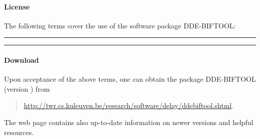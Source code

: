 \documentclass[10pt]{scrartcl}
\newcommand{\DDEBIFCODE}{\textsc{DDE-BIFTOOL}}
\newcommand{\ddebifweb}{\url{http://twr.cs.kuleuven.be/research/software/delay/ddebiftool.shtml}}
\begin{document}
\paragraph{License}
The following terms cover the use of the software package {\DDEBIFCODE}:

\bigskip\hrule
{\ttfamily
\begin{flushleft} {\parindent0pt
    \parskip5pt  }
\end{flushleft}
}
\hrule\bigskip

\paragraph{Download}

Upon acceptance of the above terms, one can obtain the package
{\DDEBIFCODE} (version \version{}) from
\begin{quote}
  \ddebifweb{}.
\end{quote}
The web page
contains also up-to-date information on newer versions and helpful
resources.
\end{document}
